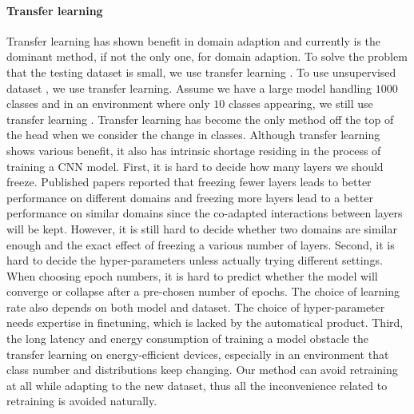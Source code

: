 \documentclass[pageno]{jpaper}
\begin{document}
\paragraph{Transfer learning}
Transfer learning has shown benefit in domain adaption and currently is the dominant method, if not the only one, for domain adaption. To solve the problem that the testing dataset is small, we use transfer learning \cite{oquab2014learning}. To use unsupervised dataset \cite{doersch2015unsupervised, noroozi2016unsupervised}, we use transfer learning. Assume we have a large model handling $1000$ classes and in an environment where only $10$ classes appearing, we still use transfer learning \cite{han2016mcdnn, shen2016fast}. Transfer learning has become the only method off the top of the head when we consider the change in classes. Although transfer learning shows various benefit, it also has intrinsic shortage residing in the process of training a CNN model. First, it is hard to decide how many layers we should freeze. Published papers \cite{yosinski2014transferable} reported that freezing fewer layers leads to better performance on different domains and freezing more layers lead to a better performance on similar domains since the co-adapted interactions between layers will be kept. However, it is still hard to decide whether two domains are similar enough and the exact effect of freezing a various number of layers. Second, it is hard to decide the hyper-parameters unless actually trying different settings. When choosing epoch numbers, it is hard to predict whether the model will converge or collapse after a pre-chosen number of epochs. The choice of learning rate also depends on both model and dataset. The choice of hyper-parameter needs expertise in finetuning, which is lacked by the automatical product. Third, the long latency and energy consumption of training a model obstacle the transfer learning on energy-efficient devices, especially in an environment that class number and distributions keep changing. Our method can avoid retraining at all while adapting to the new dataset, thus all the inconvenience related to retraining is avoided naturally.
\end{document}
